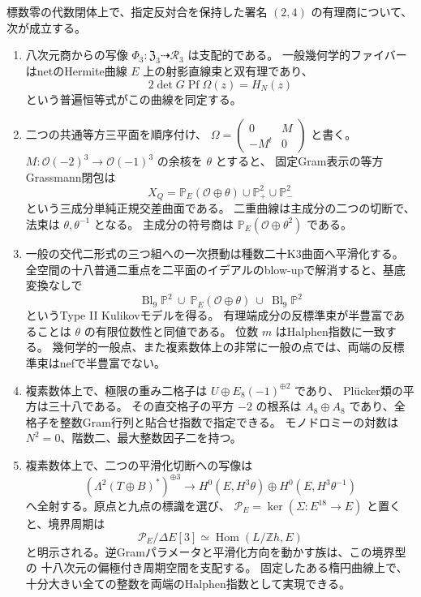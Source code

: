 \begin{theorem}[四次PrymファイバーとそのK3退化]
\label{thm:main-prym-geometry-v29}
標数零の代数閉体上で、指定反対合を保持した署名 $(2,4)$ の有理商について、次が成立する。
\begin{enumerate}
\item 八次元商からの写像 $\Phi_3:\mathfrak Z_3\dashrightarrow\mathcal R_3$ は支配的である。
一般幾何学的ファイバーはnetのHermite曲線 $E$ 上の射影直線束と双有理であり、
\[
 2\det G\operatorname{Pf}\Omega(z)=H_N(z)
\]
という普遍恒等式がこの曲線を同定する。
\item 二つの共通等方三平面を順序付け、
$\Omega=\left(\begin{smallmatrix}0&M\\-M^t&0\end{smallmatrix}\right)$ と書く。
$M:\mathcal O(-2)^3\to\mathcal O(-1)^3$ の余核を $\theta$ とすると、
固定Gram表示の等方Grassmann閉包は
\[
 X_Q=\mathbb P_E(\mathcal O\oplus\theta)\cup\mathbb P^2_+\cup\mathbb P^2_-
\]
という三成分単純正規交差曲面である。
二重曲線は主成分の二つの切断で、法束は $\theta,\theta^{-1}$ となる。
主成分の符号商は $\mathbb P_E(\mathcal O\oplus\theta^2)$ である。
\item 一般の交代二形式の三つ組への一次摂動は種数二十K3曲面へ平滑化する。
全空間の十八普通二重点を二平面のイデアルのblow-upで解消すると、基底変換なしで
\[
 \operatorname{Bl}_9\mathbb P^2\ \cup\ 
 \mathbb P_E(\mathcal O\oplus\theta)\ \cup\
 \operatorname{Bl}_9\mathbb P^2
\]
というType II Kulikovモデルを得る。
有理端成分の反標準束が半豊富であることは $\theta$ の有限位数性と同値である。
位数 $m$ はHalphen指数に一致する。
幾何学的一般点、また複素数体上の非常に一般の点では、両端の反標準束はnefで半豊富でない。
\item 複素数体上で、極限の重み二格子は $U\oplus E_8(-1)^{\oplus2}$ であり、
Pl\"ucker類の平方は三十八である。
その直交格子の平方 $-2$ の根系は $A_8\oplus A_8$ であり、全格子を整数Gram行列と貼合せ指数で指定できる。
モノドロミーの対数は $N^2=0$、階数二、最大整数因子二を持つ。
\item 複素数体上で、二つの平滑化切断への写像は
\[
 (\Lambda^2(T\oplus B)^*)^{\oplus3}\longrightarrow
 H^0(E,H^3\theta)\oplus H^0(E,H^3\theta^{-1})
\]
へ全射する。原点と九点の標識を選び、
$\mathcal P_E=\ker(\Sigma:E^{18}\to E)$ と置くと、境界周期は
\[
 \mathcal P_E/\Delta E[3]\simeq\operatorname{Hom}(L/\mathbb Zh,E)
\]
と明示される。逆Gramパラメータと平滑化方向を動かす族は、この境界型の
十八次元の偏極付き周期空間を支配する。
固定したある楕円曲線上で、十分大きい全ての整数を両端のHalphen指数として実現できる。
\end{enumerate}
\end{theorem}

